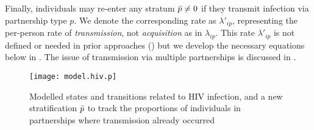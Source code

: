 Finally, individuals may re-enter any stratum $\bar{p} \ne 0$
if they transmit infection via partnership type $p$.
We denote the corresponding rate as $\lambda'_{ip}$,
representing the per-person rate of \emph{transmission},
not \emph{acquisition} as in $\lambda_{ip}$.
This rate $\lambda'_{ip}$ is not defined or needed in prior approaches ()
but we develop the necessary equations below in .
The issue of transmission via multiple partnerships is discussed in .
\begin{figure}
  \centering\texttt{[image: model.hiv.p]}
  \caption{Modelled states and transitions related to HIV infection,
    and a new stratification $\bar{p}$ to track
    the proportions of individuals in partnerships where transmission already occurred}
  \label{fig:model.hiv.p}
\end{figure}
